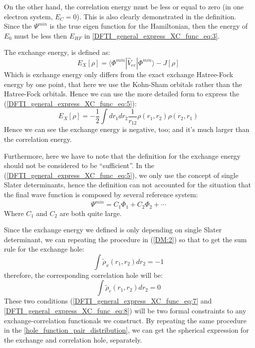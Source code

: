 On the other hand, the correlation energy must be less or equal to zero (in
one electron system, $E_{C} = 0$). This is also clearly demonstrated in the
definition. Since the $\Psi^{min}$ is the true eigen function for the
Hamiltonian, then the energy of $E_{0}$ must be less then $E_{HF}$ in
\ref{DFTI_general_express_XC_func_eq:3}.

The exchange energy, is defined as:
\begin{equation}
 \label{DFTI_general_express_XC_func_eq:5}
E_{X}[\rho] = \langle\Phi^{min}|\hat{V}_{ee}|\Phi^{min}\rangle -
J[\rho]
\end{equation} 
Which is exchange energy only differs from the exact exchange Hatree-Fock
energy by one point, that here we use the Kohn-Sham orbitals rather than 
the Hatree-Fock orbitals. Hence we can use the more detailed form to express
the (\ref{DFTI_general_express_XC_func_eq:5}):
\begin{equation}
 \label{DFTI_general_express_XC_func_eq:6}
E_{X}[\rho] = -\frac{1}{2}\int dr_{1} dr_{2}\frac{1}{r_{12}}\rho(r_{1},r_{2})
\rho(r_{2},r_{1})
\end{equation}
Hence we can see the exchange energy is negative, too; and it's much larger 
than the correlation energy.

Furthermore, here we have to note that the definition for the exchange energy
should not be considered to be ``sufficient''. In the
(\ref{DFTI_general_express_XC_func_eq:5}), we only use the concept of single
Slater determinants, hence the definition can not accounted for the situation
that the final wave function is composed by several reference system:
\begin{equation}
 \Psi^{min} = C_{1}\Phi_{1} + C_{2}\Phi_{2} + \cdots
\end{equation}
Where $C_{1}$ and $C_{2}$ are both quite large.

Since the exchange energy we defined is only depending on single Slater
determinant, we can repeating the procedure in (\ref{DM:2}) so that to get
the sum rule for the exchange hole:
\begin{equation}
 \label{DFTI_general_express_XC_func_eq:7}
\int \widetilde{\rho}_{x}(r_{1},r_{2}) dr_{2} = -1
\end{equation}
therefore, the corresponding correlation hole will be:
\begin{equation}
 \label{DFTI_general_express_XC_func_eq:8}
\int \widetilde{\rho}_{c}(r_{1},r_{2}) dr_{2} = 0
\end{equation}
These two conditions (\ref{DFTI_general_express_XC_func_eq:7} and
\ref{DFTI_general_express_XC_func_eq:8}) will be two formal constraints 
to any exchange-correlation functionals we construct. By repeating the same
procedure in the \ref{hole_function_pair_distribution}, we can get the
spherical expression for the exchange and correlation hole, separately. 


